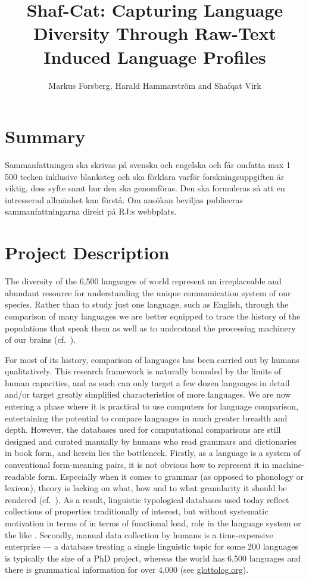 ﻿\documentclass[12pt]{article}
\author{Markus Forsberg, Harald Hammarstr\"om and Shafqat Virk}
\title{Shaf-Cat: Capturing Language Diversity Through Raw-Text Induced Language Profiles}
\begin{document}
\maketitle

\section{Summary}

Sammanfattningen ska skrivas på svenska och engelska och får omfatta max 1 500 tecken inklusive blanksteg och ska förklara varför forskningsuppgiften är viktig, dess syfte samt hur den ska genomföras. Den ska formuleras så att en intresserad allmänhet kan förstå. Om ansökan beviljas publiceras sammanfattningarna direkt på RJ:s webbplats.

\section{Project Description}
The diversity of the 6,500 languages of world represent an
irreplaceable and abundant resource for understanding the unique
communication system of our species. Rather than to study just one
language, such as English, through the comparison of many languages we
are better equipped to trace the history of the populations that speak
them as well as to understand the processing machinery of our brains
(cf.~\citealt{typ:EvansLevinson:Universals}).

For most of its history, comparison of languages has been carried out
by humans qualitatively. This research framework is naturally bounded
by the limits of human capacities, and as such can only target a few
dozen languages in detail and/or target greatly simplified
characteristics of more languages. We are now entering a phase where
it is practical to use computers for language comparison, entertaining
the potential to compare languages in much greater breadth and
depth. However, the databases used for computational comparisons are
still designed and curated manually by humans who read grammars and
dictionaries in book form, and herein lies the bottleneck. Firstly, as
a language is a system of conventional form-meaning pairs, it is not
obvious how to represent it in machine-readable form. Especially when
it comes to grammar (as opposed to phonology or lexicon), theory is
lacking on what, how and to what granularity it should be rendered
(cf.~\citealt{ling:Cysouw:Typology-Types}). As a result, linguistic
typological databases used today reflect collections of properties
traditionally of interest, but without systematic motivation in terms
of in terms of functional load, role in the language system or the
like \citep{ling:Bickel:Distributional-Typology}.  Secondly, manual
data collection by humans is a time-expensive enterprise --- a
database treating a single linguistic topic for some 200 languages is
typically the size of a PhD project, whereas the world has
6,500 languages and there is grammatical information for over 4,000
(see \url{glottolog.org}).
 
\end{document}
